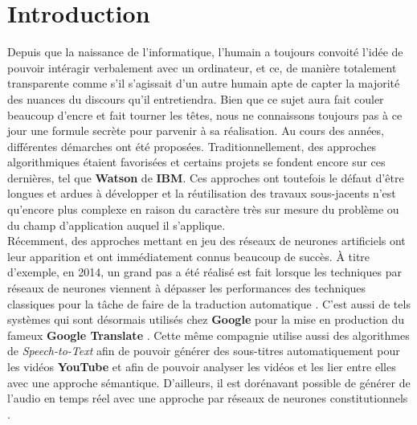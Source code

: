 \section{Introduction}
Depuis que la naissance de l'informatique, l'humain a toujours convoité l'idée de pouvoir intéragir verbalement avec un ordinateur, et ce, de manière totalement transparente comme s'il s'agissait d'un autre humain apte de capter la majorité des nuances du discours qu'il entretiendra. Bien que ce sujet aura fait couler beaucoup d'encre et fait tourner les têtes, nous ne connaissons toujours pas à ce jour une formule secrète pour parvenir à sa réalisation. Au cours des années, différentes démarches ont été proposées. Traditionnellement, des approches algorithmiques étaient favorisées et certains projets se fondent encore sur ces dernières, tel que \textbf{Watson} de \textbf{IBM}. Ces approches ont toutefois le défaut d'être longues et ardues à développer et la réutilisation des travaux sous-jacents n'est qu'encore plus complexe en raison du caractère très sur mesure du problème ou du champ d'application auquel il s'applique. \\

Récemment, des approches mettant en jeu des réseaux de neurones artificiels ont leur apparition et ont immédiatement connus beaucoup de succès. À titre d'exemple, en 2014, un grand pas a été réalisé est fait lorsque les techniques par réseaux de neurones viennent à dépasser les performances des techniques classiques pour la tâche de faire de la traduction automatique \cite{attentionMechanism}. C’est aussi de tels systèmes qui sont désormais utilisés chez \textbf{Google} pour la mise en production du fameux \textbf{Google Translate} \cite{googleTranslate}. Cette même compagnie utilise aussi des algorithmes de \textit{Speech-to-Text} afin de pouvoir générer des sous-titres automatiquement pour les vidéos \textbf{YouTube} et afin de pouvoir analyser les vidéos et les lier entre elles avec une approche sémantique.
D’ailleurs, il est dorénavant possible de générer de l’audio en temps réel avec une approche par réseaux de neurones constitutionnels \cite{wavenet}. \\

